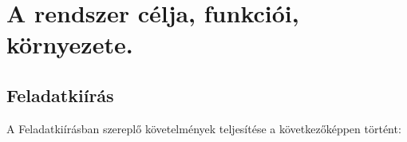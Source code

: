 \section{A rendszer célja, funkciói, környezete.}

\subsection{Feladatkiírás}
A Feladatkiírásban szereplő követelmények teljesítése a következőképpen történt: